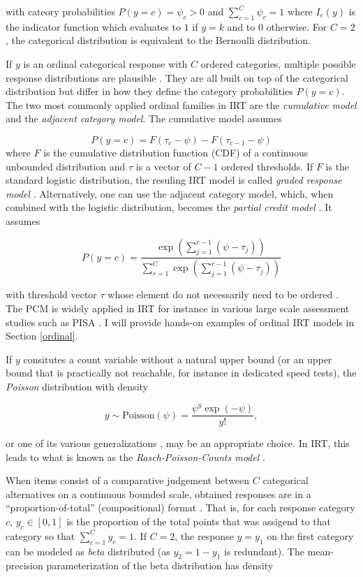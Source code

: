 \documentclass[jss]{jss}
\begin{document}
with cateory probabilities \(P(y = c) = \psi_c > 0\) and
\(\sum_{c=1}^C \psi_c = 1\) where \(I_c(y)\) is the indicator function
which evaluates to \(1\) if \(y = k\) and to \(0\) otherwise. For
\(C = 2\), the categorical distribution is equivalent to the Bernoulli
distribution.

If \(y\) is an ordinal categorical response with \(C\) ordered
categories, multiple possible response distributions are plausible
\citep{agresti2010, buerkner2019}. They are all built on top of the
categorical distribution but differ in how they define the category
probabilities \(P(y = c)\). The two most commonly applied ordinal
families in IRT are the \emph{cumulative model} and the \emph{adjacent
category model}. The cumulative model assumes

\[
P(y = c) = F(\tau_c - \psi) - F(\tau_{c-1} - \psi)
\] where \(F\) is the cumulative distribution function (CDF) of a
continuous unbounded distribution and \(\tau\) is a vector of \(C-1\)
ordered thresholds. If \(F\) is the standard logistic distribution, the
resuling IRT model is called \emph{graded response model}
\citep[GRM;][]{samejima1997}. Alternatively, one can use the adjacent
category model, which, when combined with the logistic distribution,
becomes the \emph{partial credit model} \citep[PCM;][]{rasch1961}. It
assumes

\[
P(y = c) = \frac{\exp \left(\sum_{j=1}^{c-1} (\psi -\tau_{j}) \right)}
  {\sum_{r=1}^{C} \exp\left(\sum_{j=1}^{r-1} (\psi -\tau_{j}) \right)}
\]

with threshold vector \(\tau\) whose element do not necessarily need to
be ordered \citep{adams2012}. The PCM is widely applied in IRT for
instance in various large scale assessment studies such as PISA
\citep{oecd2017}. I will provide hands-on examples of ordinal IRT models
in Section \ref{ordinal}.

If \(y\) consitutes a count variable without a natural upper bound (or
an upper bound that is practically not reachable, for instance in
dedicated speed tests), the \emph{Poisson} distribution with density

\[
y \sim \text{Poisson}(\psi) = \frac{\psi^y \exp(-\psi)}{y!},
\]

or one of its various generalizations \citep[e.g., see][]{shmueli2005},
may be an appropriate choice. In IRT, this leads to what is known as the
\emph{Rasch-Poisson-Counts model} \citep[RPCM;][]{rasch1960}.

When items consist of a comparative judgement between \(C\) categorical
alternatives on a continuous bounded scale, obtained responses are in a
``proportion-of-total'' (compositional) format \citep{hijazi2009}. That
is, for each response category \(c\), \(y_c \in [0, 1]\) is the
proportion of the total points that was assigend to that category so
that \(\sum_{c=1}^C y_c = 1\). If \(C = 2\), the response \(y = y_1\) on
the first category can be modeled as \emph{beta} distributed (as
\(y_2 = 1 - y_1\) is redundant). The mean-precision parameterization of
the beta distribution has density
\end{document}

